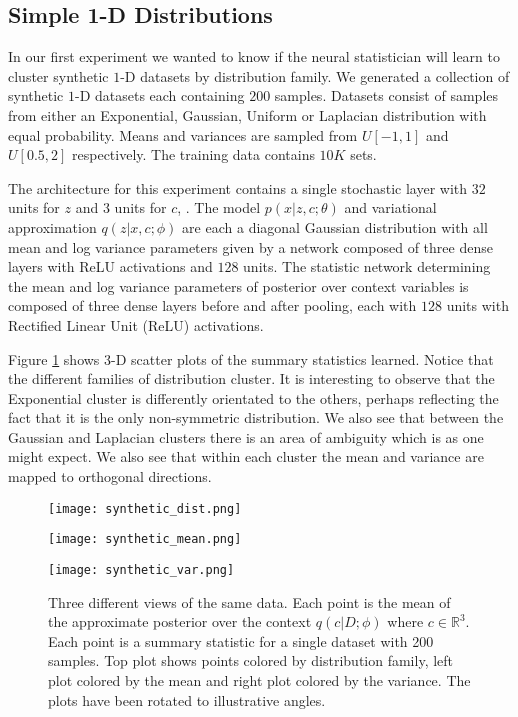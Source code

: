 \documentclass{article} \usepackage{iclr2017_conference,times}
\begin{document}
\subsection{Simple 1-D Distributions}
In our first experiment we wanted to know if the neural statistician will learn to cluster synthetic $1$-D datasets by distribution family. We generated a collection of synthetic $1$-D datasets each containing $200$ samples. Datasets consist of samples from either an Exponential, Gaussian, Uniform or Laplacian distribution with equal probability. Means and variances are sampled from $U[-1,1]$ and $U[0.5,2]$ respectively. The training data contains $10K$ sets.

 The architecture for this experiment contains a single stochastic layer with $32$ units for $z$ and $3$ units for $c$, . The model $p(x | z,c ; \theta)$ and variational approximation $q(z | x,c ; \phi)$ are each a diagonal Gaussian distribution with all mean and log variance parameters given by a network composed of three dense layers with ReLU activations and $128$ units. The statistic network determining the mean and log variance parameters of posterior over context variables is composed of three dense layers before and after pooling, each with $128$ units with Rectified Linear Unit (ReLU) activations.
 
Figure \ref{fig:synthetic_data}  shows  3-D scatter plots of the summary statistics learned. Notice that the different families of distribution cluster. It is interesting to observe that the Exponential cluster is differently orientated to the others, perhaps reflecting the fact that it is the only non-symmetric distribution. We also see that between the Gaussian and Laplacian clusters there is an area of ambiguity which is as one might expect. We also see that within each cluster the mean and variance are mapped to orthogonal directions.
\begin{figure}
\centering
\begin{minipage}{0.4\textwidth}
\hspace{-2em}
\texttt{[image: synthetic\_dist.png]}
\vspace{0.4em}
\end{minipage}

\begin{minipage}{0.4\textwidth}
\texttt{[image: synthetic\_mean.png]}
\end{minipage}
\begin{minipage}{0.4\textwidth}
\vspace{-0.9em}
\texttt{[image: synthetic\_var.png]}
\end{minipage}
\caption{Three different views of the same data. Each point is the mean of the approximate posterior over the context $q(c | D ;\phi)$ where $c \in \mathbb{R}^3$. Each point is a summary statistic for a single dataset with 200 samples. Top plot shows points colored by distribution family, left plot colored by the mean and right plot colored by the variance. The plots have been rotated to illustrative angles. \label{fig:synthetic_data}}
\end{figure}
\end{document}
